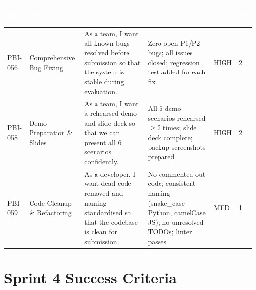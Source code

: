 \documentclass[10pt,a4paper]{article}
\begin{document}
\begin{tabularx}{\textwidth}{|L{1.5cm}|L{3cm}|X|L{3cm}|L{1cm}|L{0.6cm}|}
\hline
{}
\textcolor{white}{\textbf{ID}} &
\textcolor{white}{\textbf{Title}} &
\textcolor{white}{\textbf{User Story}} &
\textcolor{white}{\textbf{Acceptance Criteria}} &
\textcolor{white}{\textbf{Pri.}} &
\textcolor{white}{\textbf{SP}} \\ \hline

PBI-056 &
Comprehensive Bug Fixing &
As a team, I want all known bugs resolved before submission so that the system is stable during evaluation. &
Zero open P1/P2 bugs; all issues closed; regression test added for each fix &
HIGH & 2 \\ \hline

PBI-058 &
Demo Preparation \& Slides &
As a team, I want a rehearsed demo and slide deck so that we can present all 6 scenarios confidently. &
All 6 demo scenarios rehearsed $\geq$2 times; slide deck complete; backup screenshots prepared &
HIGH & 2 \\ \hline

PBI-059 &
Code Cleanup \& Refactoring &
As a developer, I want dead code removed and naming standardised so that the codebase is clean for submission. &
No commented-out code; consistent naming (snake\_case Python, camelCase JS); no unresolved TODOs; linter passes &
MED & 1 \\ \hline

\end{tabularx}

\vspace{0.8em}

\section{Sprint 4 Success Criteria}
\end{document}
